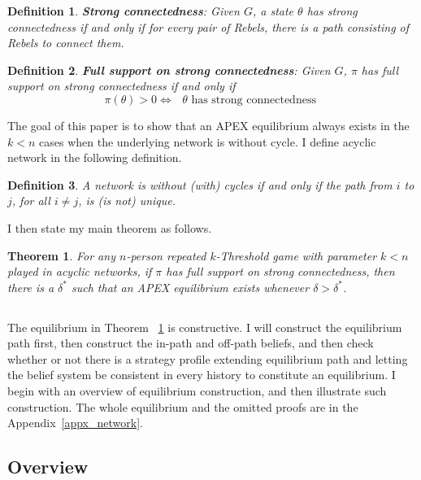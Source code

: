 \documentclass[12pt,letter]{article}
\newtheorem{theorem}{Theorem}
\newtheorem{definition}{Definition}[section]
\theoremstyle{definition}
\theoremstyle{remark}
\theoremstyle{claim}
\begin{document}
\begin{definition}
\textbf{Strong connectedness}: Given $G$, a state $\theta$ has strong connectedness if and only if for every pair of Rebels, there is a path consisting of Rebels to connect them.
\end{definition}  

\begin{definition}
\textbf{Full support on strong connectedness}: Given $G$, $\pi$ has full support on strong connectedness if and only if 
\[\pi(\theta)>0\Leftrightarrow \text{ $\theta$ has strong connectedness }\] 
\end{definition}  


The goal of this paper is to show that an APEX equilibrium always exists in the $k<n$ cases when the underlying network is without cycle. I define acyclic network in the following definition.
\begin{definition}
A network is without (with) cycles if and only if the path from $i$ to $j$, for all $i\neq j$, is (is not) unique. 
\end{definition}

I then state my main theorem as follows. 

\begin{theorem}
\label{thm_main_result}
For any $n$-person repeated $k$-Threshold game with parameter $k < n$ played in acyclic networks, if $\pi$ has full support on strong connectedness, then there is a $\delta^{*}$ such that an APEX equilibrium exists whenever $\delta>\delta^{*}$.
\end{theorem}

\subsection*{}
The equilibrium in Theorem ~\ref{thm_main_result} is constructive. I will construct the equilibrium path first, then construct the in-path and off-path beliefs, and then check whether or not there is a strategy profile extending equilibrium path and letting the belief system be consistent in every history to constitute an equilibrium. I begin with an overview of equilibrium construction, and then illustrate such construction. The whole equilibrium and the omitted proofs are in the Appendix~\ref{appx_network}.  

\subsection{Overview}
\end{document}
